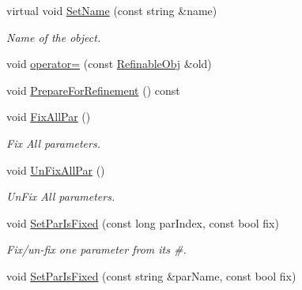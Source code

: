 \begin{DoxyCompactItemize}
virtual void \mbox{\hyperlink{class_obj_cryst_1_1_refinable_obj_a18aa908aff25a8eb86124ea5164c4f1c}{Set\+Name}} (const string \&name)
\begin{DoxyCompactList}\small\item\em Name of the object. \end{DoxyCompactList}\item 
void \mbox{\hyperlink{class_obj_cryst_1_1_refinable_obj_ab9b15adff1092f15e8f06cfeecc314f8}{operator=}} (const \mbox{\hyperlink{class_obj_cryst_1_1_refinable_obj}{Refinable\+Obj}} \&old)
\item 
void \mbox{\hyperlink{class_obj_cryst_1_1_refinable_obj_a6710a75c0477b6ad7e42400cdc6f1c32}{Prepare\+For\+Refinement}} () const
\item 
\mbox{\label{class_obj_cryst_1_1_refinable_obj_ac1a65da1f7563472badaf699002b8b8b}} 
void \mbox{\hyperlink{class_obj_cryst_1_1_refinable_obj_ac1a65da1f7563472badaf699002b8b8b}{Fix\+All\+Par}} ()
\begin{DoxyCompactList}\small\item\em Fix All parameters. \end{DoxyCompactList}\item 
\mbox{\label{class_obj_cryst_1_1_refinable_obj_ab75dcf763d7f96063dcb4d85e6e78007}} 
void \mbox{\hyperlink{class_obj_cryst_1_1_refinable_obj_ab75dcf763d7f96063dcb4d85e6e78007}{Un\+Fix\+All\+Par}} ()
\begin{DoxyCompactList}\small\item\em Un\+Fix All parameters. \end{DoxyCompactList}\item 
\mbox{\label{class_obj_cryst_1_1_refinable_obj_ad6284ca6b92364e1ebd02bbef81d7e7e}} 
void \mbox{\hyperlink{class_obj_cryst_1_1_refinable_obj_ad6284ca6b92364e1ebd02bbef81d7e7e}{Set\+Par\+Is\+Fixed}} (const long par\+Index, const bool fix)
\begin{DoxyCompactList}\small\item\em Fix/un-\/fix one parameter from its \#. \end{DoxyCompactList}\item 
\mbox{\label{class_obj_cryst_1_1_refinable_obj_a8dc4cb100f839e12a9e0ae01facc5c9c}} 
void \mbox{\hyperlink{class_obj_cryst_1_1_refinable_obj_a8dc4cb100f839e12a9e0ae01facc5c9c}{Set\+Par\+Is\+Fixed}} (const string \&par\+Name, const bool fix)

\end{DoxyCompactItemize}

